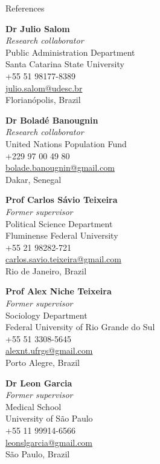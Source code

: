 \begin{rSection}{References}

\begin{multicols}{2}

{\textbf{Dr Julio Salom}}\\
{\textit{Research collaborator}}\\
{Public Administration Department}\\
{Santa Catarina State University}\\
{+55 51 98177-8389}\\
\href{mailto:julio.salom@udesc.br}{julio.salom@udesc.br}\\
{Florianópolis, Brazil}\par 

{\textbf{Dr Boladé Banougnin}}\\
{\textit{Research collaborator}}\\
{United Nations Population Fund}\\
{+229 97 00 49 80}\\
\href{mailto:bolade.banougnin@gmail.com}{bolade.banougnin@gmail.com}\\
{Dakar, Senegal}\par 

{\textbf{Prof Carlos Sávio Teixeira}}\\
{\textit{Former supervisor}}\\
{Political Science Department}\\
{Fluminense Federal University}\\
{+55 21 98282-721}\\
\href{mailto:carlos.savio.teixeira@gmail.com}{carlos.savio.teixeira@gmail.com}\\
{Rio de Janeiro, Brazil} \par


{\textbf{Prof Alex Niche Teixeira}}\\
{\textit{Former supervisor}}\\
{Sociology Department}\\
{Federal University of Rio Grande do Sul}\\
{+55 51 3308-5645}\\
\href{mailto:alexnt.ufrgs@gmail.com}{alexnt.ufrgs@gmail.com}\\
{Porto Alegre, Brazil}\par 

{\textbf{Dr Leon Garcia}}\\
{\textit{Former supervisor}}\\
{Medical School}\\
{University of São Paulo}\\
{+55 11 99914-6566}\\
\href{mailto:leonslgarcia@gmail.com}{leonslgarcia@gmail.com}\\
{São Paulo, Brazil}\par


\end{multicols}
\end{rSection}
